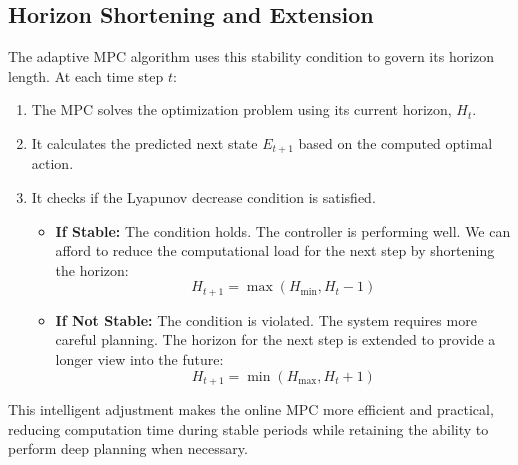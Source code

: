 \subsection{Horizon Shortening and Extension}
The adaptive MPC algorithm uses this stability condition to govern its horizon length. At each time step $t$:
\begin{enumerate}
    \item The MPC solves the optimization problem using its current horizon, $H_t$.
    \item It calculates the predicted next state $E_{t+1}$ based on the computed optimal action.
    \item It checks if the Lyapunov decrease condition is satisfied.
    \begin{itemize}
        \item \textbf{If Stable:} The condition holds. The controller is performing well. We can afford to reduce the computational load for the next step by shortening the horizon:
        \begin{equation}
            H_{t+1} = \max(H_{\min}, H_t - 1)
        \end{equation}
        \item \textbf{If Not Stable:} The condition is violated. The system requires more careful planning. The horizon for the next step is extended to provide a longer view into the future:
        \begin{equation}
            H_{t+1} = \min(H_{\max}, H_t + 1)
        \end{equation}
    \end{itemize}
\end{enumerate}
This intelligent adjustment makes the online MPC more efficient and practical, reducing computation time during stable periods while retaining the ability to perform deep planning when necessary.